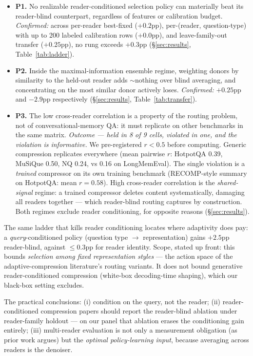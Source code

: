\begin{itemize}[leftmargin=1.2em, itemsep=2pt]
\item \textbf{P1.} No realizable reader-conditioned selection policy can
  materially beat its reader-blind counterpart, regardless of features or
  calibration budget. \emph{Confirmed:} across per-reader best-fixed ($+0.2$pp),
  per-(reader, question-type) with up to 200 labeled calibration rows
  ($+0.0$pp), and leave-family-out transfer ($+0.25$pp), no rung exceeds
  $+0.3$pp (\S\ref{sec:results}, Table~\ref{tab:ladder}).
\item \textbf{P2.} Inside the maximal-information ensemble regime, weighting
  donors by similarity to the held-out reader adds $\sim$nothing over blind
  averaging, and concentrating on the most similar donor actively loses.
  \emph{Confirmed:} $+0.25$pp and $-2.9$pp respectively
  (\S\ref{sec:results}, Table~\ref{tab:transfer}).
\item \textbf{P3.} The low cross-reader correlation is a property of the routing
  problem, not of conversational-memory QA: it must replicate on other
  benchmarks in the same matrix. \emph{Outcome --- held in 8 of 9 cells,
  violated in one, and the violation is informative.} We pre-registered
  $r < 0.5$ before computing. Generic compression replicates everywhere (mean
  pairwise $r$: HotpotQA 0.39, MuSiQue 0.50, NQ 0.24, vs 0.16 on LongMemEval).
  The single violation is a \emph{trained} compressor on its own training
  benchmark (RECOMP-style summary on HotpotQA: mean $r = 0.58$). High
  cross-reader correlation is the \emph{shared-signal} regime: a trained
  compressor deletes content systematically, damaging all readers together ---
  which reader-blind routing captures by construction. Both regimes exclude
  reader conditioning, for opposite reasons (\S\ref{sec:results}).
\end{itemize}

The same ladder that kills reader conditioning locates where adaptivity does
pay: a \emph{query}-conditioned policy (question type $\rightarrow$
representation) gains $+2.5$pp reader-blind, against $\le0.3$pp for reader
identity. Scope, stated up front: this bounds \emph{selection among fixed
representation styles} --- the action space of the adaptive-compression
literature's routing variants. It does not bound generative reader-conditioned
compression (white-box decoding-time shaping), which our black-box setting
excludes.

The practical conclusions: (i) condition on the query, not the reader;
(ii) reader-conditioned compression papers should report the reader-blind
ablation under reader-family holdout --- on our panel that ablation erases the
conditioning gain entirely; (iii) multi-reader evaluation is not only a
measurement obligation (as prior work argues) but the \emph{optimal
policy-learning input}, because averaging across readers is the denoiser.
